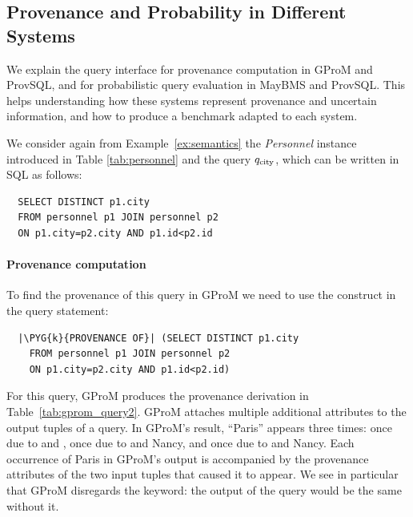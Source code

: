 \begin{toappendix}
\section{Provenance and Probability in Different Systems}
\label{sec:practical}




We explain the query interface for provenance computation in GProM and
ProvSQL, and for probabilistic query evaluation in MayBMS and ProvSQL.
This helps understanding how these systems represent provenance and
uncertain information, and how to produce a benchmark adapted to each
system.

We consider again from Example~\ref{ex:semantics}
the \emph{Personnel} instance introduced in
Table \ref{tab:personnel} and the query $q_{\mathrm{city}}$, which can be written in
SQL as follows:
\begin{verbatim}
  SELECT DISTINCT p1.city
  FROM personnel p1 JOIN personnel p2
  ON p1.city=p2.city AND p1.id<p2.id
\end{verbatim}

\paragraph*{Provenance computation}
To find the provenance of this query in GProM we need to use the
construct in the query statement:
\begin{verbatim}
  |\PYG{k}{PROVENANCE OF}| (SELECT DISTINCT p1.city
    FROM personnel p1 JOIN personnel p2
    ON p1.city=p2.city AND p1.id<p2.id)
\end{verbatim}
For this query, GProM produces the provenance derivation in Table~\ref{tab:gprom_query2}.
GProM attaches multiple additional attributes to the output tuples of a query.
In GProM's result, ``Paris'' appears three times: once due to
{} and
{}, once due to {} and {Nancy}, and once due to
  {}
and {Nancy}. Each occurrence of {Paris} in GProM's output is accompanied
by the provenance attributes of the two input tuples that caused it to
appear. We see in particular that GProM disregards the
 keyword: the output of the query would be the
same without it.


\end{toappendix}
